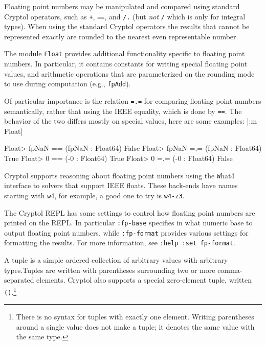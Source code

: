 Floating point numbers may be manipulated and compared using
standard Cryptol operators, such as \texttt{+}, \texttt{==}, and \texttt{/.}
(but {\em not} \texttt{/} which is only for integral types).
When using the standard Cryptol operators the results that cannot be
represented exactly are rounded to the nearest even representable number.

The module \texttt{Float} provides additional functionality specific
to floating point numbers.  In particular, it contains constants for
writing special floating point values, and arithmetic operations
that are parameterized on the rounding mode to use during computation
(e.g., \texttt{fpAdd}).

Of particular importance is the relation \texttt{=.=} for comparing
floating point numbers semantically, rather that using the IEEE equality,
which is done by \texttt{==}.  The behavior of the two differs
mostly on special values, here are some examples:
\restartrepl
\hidereplin|:m Float|
\begin{replPrompt}
Float> fpNaN == (fpNaN : Float64)
False
Float> fpNaN =.= (fpNaN : Float64)
True
Float> 0 == (-0 : Float64)
True
Float> 0 =.= (-0 : Float64)
False
\end{replPrompt}
\restartrepl

Cryptol supports reasoning about floating point numbers using the
{\texttt What4} interface to solvers that support IEEE floats.
These back-ends have names starting with {\texttt w4}, for example,
a good one to try is \texttt{w4-z3}.

The Cryptol REPL has some settings to control how floating point numbers
are printed on the REPL.  In particular \texttt{:fp-base} specifies
in what numeric base to output floating point numbers, while
\texttt{:fp-format} provides various settings for formatting the
results.   For more information, see \texttt{:help :set fp-format}.



A tuple is a simple ordered collection of arbitrary values with
arbitrary types.\indTheTupleType Tuples are written with parentheses
surrounding two or more comma-separated elements. Cryptol also
supports a special zero-element tuple, written
\texttt{()}.\footnote{There is no syntax for tuples with exactly one
  element. Writing parentheses around a single value does not make a
  tuple; it denotes the same value with the same type.}

